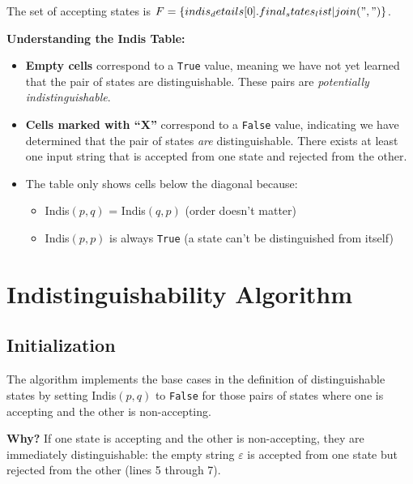 {%
\noindent The set of accepting states is $F = \{ {{ indis_details[0].final_states_list|join(", ") }} \}$.
{%

\vspace{1em}
\noindent\textbf{Understanding the Indis Table:}
\begin{itemize}[itemsep=0.2em]
\item \textbf{Empty cells} correspond to a \texttt{True} value, meaning we have not yet learned that the pair of states are distinguishable. These pairs are \emph{potentially indistinguishable}.
\item \textbf{Cells marked with ``X''} correspond to a \texttt{False} value, indicating we have determined that the pair of states \emph{are} distinguishable. There exists at least one input string that is accepted from one state and rejected from the other.
\item The table only shows cells below the diagonal because:
  \begin{itemize}
  \item Indis$(p, q)$ = Indis$(q, p)$ (order doesn't matter)
  \item Indis$(p, p)$ is always \texttt{True} (a state can't be distinguished from itself)
  \end{itemize}
\end{itemize}

\section{Indistinguishability Algorithm}

{%

{%
\subsection*{Initialization}

The algorithm implements the base cases in the definition of distinguishable states by setting Indis$(p, q)$
to \texttt{False} for those pairs of states where one is accepting and the other is non-accepting.

\textbf{Why?} If one state is accepting and the other is non-accepting, they are immediately distinguishable:
the empty string $\varepsilon$ is accepted from one state but rejected from the other (lines 5 through 7).

}}}}
